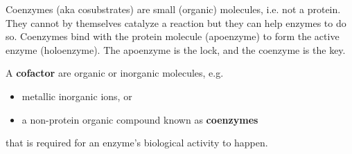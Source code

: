 Coenzymes (aka cosubstrates) are small (organic) molecules, i.e. not a protein.
They cannot by themselves catalyze a reaction but they can help enzymes to do so.
Coenzymes bind with the protein molecule (apoenzyme) to form the active enzyme
(holoenzyme).  The apoenzyme is the lock, and the coenzyme is the key.

\begin{mdframed}

A {\bf cofactor} are organic or inorganic molecules, e.g.
\begin{itemize}
  \item metallic inorganic ions, or

  \item a non-protein organic compound known as {\bf coenzymes }
\end{itemize}
that is required for an enzyme's biological activity to happen.
\end{mdframed}


